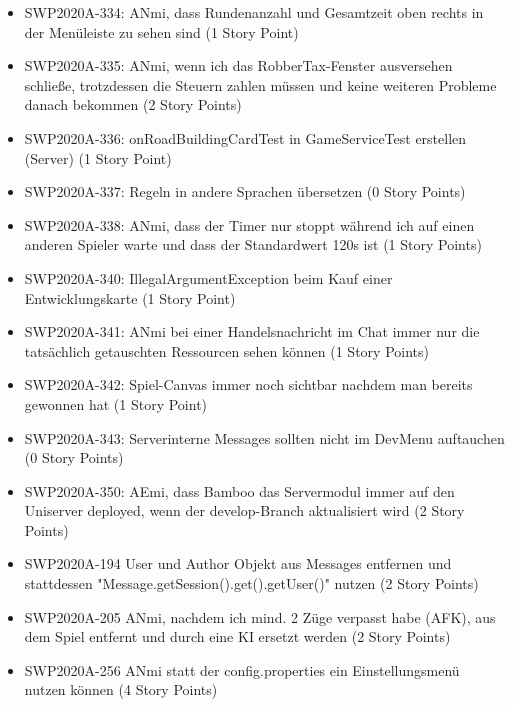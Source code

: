\documentclass[12pt,a4paper, oneside]{article}
\begin{document}
\begin{itemize}
        \item SWP2020A-334: ANmi, dass Rundenanzahl und Gesamtzeit oben rechts in der Menüleiste zu sehen sind (1 Story Point)

        \item SWP2020A-335: ANmi, wenn ich das RobberTax-Fenster ausversehen schließe, trotzdessen die Steuern zahlen müssen und keine weiteren Probleme danach bekommen (2 Story Points)

        \item SWP2020A-336: onRoadBuildingCardTest in GameServiceTest erstellen (Server) (1 Story Point)

        \item SWP2020A-337: Regeln in andere Sprachen übersetzen (0 Story Points)

        \item SWP2020A-338: ANmi, dass der Timer nur stoppt während ich auf einen anderen Spieler warte und dass der Standardwert 120s ist (1 Story Points)

        \item SWP2020A-340: IllegalArgumentException beim Kauf einer Entwicklungskarte (1 Story Point)

        \item SWP2020A-341: ANmi bei einer Handelsnachricht im Chat immer nur die tatsächlich getauschten Ressourcen sehen können (1 Story Points)

        \item SWP2020A-342: Spiel-Canvas immer noch sichtbar nachdem man bereits gewonnen hat (1 Story Point)

        \item SWP2020A-343: Serverinterne Messages sollten nicht im DevMenu auftauchen (0 Story Points)

        \item SWP2020A-350: AEmi, dass Bamboo das Servermodul immer auf den Uniserver deployed, wenn der develop-Branch aktualisiert wird (2 Story Points)

        \item SWP2020A-194 User und Author Objekt aus Messages entfernen und stattdessen "Message.getSession().get().getUser()" nutzen (2 Story Points)

        \item SWP2020A-205 ANmi, nachdem ich mind. 2 Züge verpasst habe (AFK), aus dem Spiel entfernt und durch eine KI ersetzt werden (2 Story Points)

        \item SWP2020A-256 ANmi statt der config.properties ein Einstellungsmenü nutzen können (4 Story Points)


\end{itemize}
\end{document}
